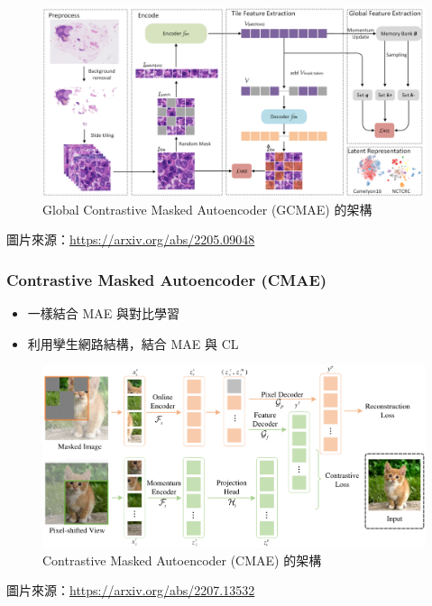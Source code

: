 \documentclass[xcolor=dvipsnames]{beamer}
\begin{document}
    \begin{frame}
        \begin{figure}
            \centering
            \includegraphics[width=1\textwidth]{src/GCMAE.png}
            \caption{Global Contrastive Masked Autoencoder (GCMAE) 的架構}
            \label{fig:gcmae_architecture}
        \end{figure}
        圖片來源：\url{https://arxiv.org/abs/2205.09048}
    \end{frame}

    \begin{frame}
        \frametitle{Contrastive Masked Autoencoder (CMAE)}
        \begin{itemize}
            \item 一樣結合 MAE 與對比學習
            \item 利用孿生網路結構，結合 MAE 與 CL
        \end{itemize}
    \end{frame}

    \begin{frame}
        \begin{figure}
            \centering
            \includegraphics[width=1\textwidth]{src/CMAE.png}
            \caption{Contrastive Masked Autoencoder (CMAE) 的架構}
            \label{fig:cmae_architecture}
        \end{figure}
        圖片來源：\url{https://arxiv.org/abs/2207.13532}
    \end{frame}
\end{document}
